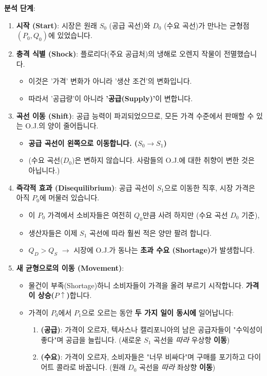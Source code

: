 \documentclass[11pt,a4paper]{article}
\theoremstyle{definition}
\begin{document}
\textbf{분석 단계}:

\begin{enumerate}
    \item \textbf{시작 (Start)}: 시장은 원래 $S_0$ (공급 곡선)와 $D_0$ (수요 곡선)가 만나는 균형점 $(P_0, Q_0)$에 있었습니다.

    \item \textbf{충격 식별 (Shock)}: 플로리다(주요 공급처)의 냉해로 오렌지 작물이 전멸했습니다.
        \begin{itemize}
            \item 이것은 '가격' 변화가 아니라 '생산 조건'의 변화입니다.
            \item 따라서 '공급량'이 아니라 \textbf{'공급(Supply)'}이 변합니다.
        \end{itemize}

    \item \textbf{곡선 이동 (Shift)}: 공급 능력이 파괴되었으므로, 모든 가격 수준에서 판매할 수 있는 O.J.의 양이 줄어듭니다.
        \begin{itemize}
            \item \textbf{공급 곡선이 왼쪽으로 이동합니다. ($S_0 \rightarrow S_1$)}
            \item (수요 곡선($D_0$)은 변하지 않습니다. 사람들의 O.J.에 대한 취향이 변한 것은 아닙니다.)
        \end{itemize}

    \item \textbf{즉각적 효과 (Disequilibrium)}: 공급 곡선이 $S_1$으로 이동한 직후, 시장 가격은 아직 $P_0$에 머물러 있습니다.
        \begin{itemize}
            \item 이 $P_0$ 가격에서 소비자들은 여전히 $Q_0$만큼 사려 하지만 (수요 곡선 $D_0$ 기준),
            \item 생산자들은 이제 $S_1$ 곡선에 따라 훨씬 적은 양만 팔려 합니다.
            \item $Q_D > Q_S$ $\rightarrow$ 시장에 O.J.가 동나는 \textbf{초과 수요 (Shortage)}가 발생합니다.
        \end{itemize}

    \item \textbf{새 균형으로의 이동 (Movement)}:
        \begin{itemize}
            \item 물건이 부족(Shortage)하니 소비자들이 가격을 올려 부르기 시작합니다. \textbf{가격이 상승($P \uparrow$)}합니다.
            \item 가격이 $P_0$에서 $P_1$으로 오르는 동안 \textbf{두 가지 일이 동시에} 일어납니다:
                \begin{enumerate}
                    \item \textbf{(공급)}: 가격이 오르자, 텍사스나 캘리포니아의 남은 공급자들이 "수익성이 좋다"며 공급을 늘립니다. (새로운 $S_1$ 곡선을 \textit{따라} 우상향 \textbf{이동})
                    \item \textbf{(수요)}: 가격이 오르자, 소비자들은 "너무 비싸다"며 구매를 포기하고 다이어트 콜라로 바꿉니다. (원래 $D_0$ 곡선을 \textit{따라} 좌상향 \textbf{이동})
                \end{enumerate}
        \end{itemize}


\end{enumerate}
\end{document}
